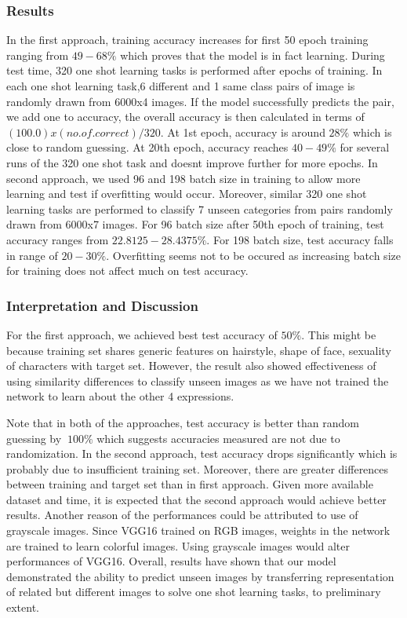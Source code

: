 \documentclass{article}
\begin{document}
\subsubsection{\textbf{Results}}

In the first approach, training accuracy increases for first 50 epoch training ranging from $49-68\%$ which proves that the model is in fact learning. During test time, 320 one shot learning tasks is performed after epochs of training. In each one shot learning task,6 different and 1 same class pairs of image is randomly drawn from 6000x4 images. If the model successfully predicts the pair, we add one to accuracy, the overall accuracy is then calculated in terms of $(100.0)x( no.of.correct )/ 320$. At 1st epoch, accuracy is around $28\%$ which is close to random guessing. At 20th epoch, accuracy reaches $40-49\%$ for several runs of the 320 one shot task and doesnt improve further for more epochs. In second approach, we used 96 and 198 batch size in training to allow more learning and test if overfitting would occur. Moreover, similar 320 one shot learning tasks are performed to classify 7 unseen categories from pairs randomly drawn from 6000x7 images. For 96 batch size after 50th epoch of training, test accuracy ranges from $22.8125-28.4375\%$. For 198 batch size, test accuracy falls in range of $20-30\%$. Overfitting seems not to be occured as increasing batch size for training does not affect much on test accuracy.

\subsubsection{\textbf{Interpretation and Discussion}}

For the first approach, we achieved best test accuracy of $50\%$. This might be because training set shares generic features on hairstyle, shape of face, sexuality of characters with target set. However, the result also showed effectiveness of using similarity differences to classify unseen images as we have not trained the network to learn about the other 4 expressions.

Note that in both of the approaches, test accuracy is better than random guessing by $~100\%$ which suggests accuracies measured are not due to randomization. In the second approach, test accuracy drops significantly which is probably due to insufficient training set. Moreover, there are greater differences between training and target set than in first approach. Given more available dataset and time, it is expected that the second approach would achieve better results. Another reason of the performances could be attributed to use of grayscale images. Since VGG16 trained on RGB images, weights in the network are trained to learn colorful images. Using grayscale images would alter performances of VGG16. Overall, results have shown that our model demonstrated the ability to predict unseen images by transferring representation of related but different images to solve one shot learning tasks, to preliminary extent.
\end{document}
